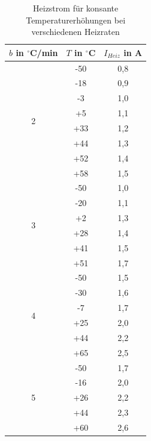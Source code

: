 \begin{table}[H]
 \begin{tabular}{c|c|c}
 $b$ in $^\circ$C/min & $T$ in $^\circ$C & $I_{Heiz}$ in A\\
 \hline
 \multirow{8}{0mm}{2} &-50&0,8\\
 &-18 & 0,9\\
 &-3 & 1,0 \\
 &+5 & 1,1 \\
 &+33 & 1,2 \\
 &+44 & 1,3 \\
 &+52 & 1,4 \\
 &+58 & 1,5 \\
 \hline
 \multirow{6}{0mm}{3} &-50&1,0\\
 &-20&1,1\\
 &+2&1,3\\
 &+28&1,4\\
 &+41&1,5\\
 &+51&1,7\\
 \hline
 \multirow{6}{0mm}{4} &-50&1,5\\
 &-30&1,6\\
 &-7&1,7\\
 &+25&2,0\\
 &+44&2,2\\
 &+65&2,5\\
 \hline
 \multirow{6}{0mm}{5} &-50&1,7\\
 &-16&2,0\\
 &+26&2,2\\
 &+44&2,3\\
 &+60&2,6\\ 
 \end{tabular}
\caption{Heizstrom für konsante Temperaturerhöhungen bei verschiedenen Heizraten}
\label{tab_heizrate}
\end{table}

